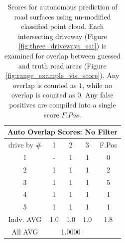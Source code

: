 \documentclass[numbered,pdftex]{ohio-etd}
\begin{document}
{{		\begin{table}[H]
			\centering
			\begin{tabular}{|llllc|}
				\hline
				\multicolumn{5}{|c|}{Auto Overlap Scores: No Filter}                                                                            \\ \hline
				\multicolumn{1}{|c|}{drive by \#}& \multicolumn{1}{c|}{1} 	& \multicolumn{1}{c|}{2} 	& \multicolumn{1}{c|}{3}   	& F.Pos 	\\ \hline
				\multicolumn{1}{|c|}{1}          & \multicolumn{1}{c|}{-} 	& \multicolumn{1}{c|}{1} 	& \multicolumn{1}{c|}{1}   	& 0     	\\ \hline
				\multicolumn{1}{|c|}{2}          & \multicolumn{1}{c|}{1} 	& \multicolumn{1}{c|}{1} 	& \multicolumn{1}{c|}{1}   	& 2     	\\ \hline
				\multicolumn{1}{|c|}{3}          & \multicolumn{1}{c|}{1} 	& \multicolumn{1}{c|}{1} 	& \multicolumn{1}{c|}{1}   	& 5     	\\ \hline
				\multicolumn{1}{|c|}{4}          & \multicolumn{1}{c|}{1} 	& \multicolumn{1}{c|}{1} 	& \multicolumn{1}{c|}{1}   	& 1     	\\ \hline
				\multicolumn{1}{|c|}{5}          & \multicolumn{1}{c|}{1} 	& \multicolumn{1}{c|}{1} 	& \multicolumn{1}{c|}{1}   	& 1     	\\ \hline
				\multicolumn{1}{|c|}{Indv. AVG}  & \multicolumn{1}{c|}{1.0} & \multicolumn{1}{c|}{1.0} 	& \multicolumn{1}{c|}{1.0} 	& 1.8 		\\ \hline
				\multicolumn{1}{|c|}{All AVG}    & \multicolumn{3}{c|}{1.0000}                                                   	&			\\ \hline
			\end{tabular}
			\caption[Overlap Scoring Table - Auto with No Classification Filter]{Scores for autonomous prediction of road surfaces using un-modified classified point cloud. Each intersecting driveway (Figure \ref{fig:three_driveways_sat}) is examined for overlap between guessed and truth road areas (Figure \ref{fig:range_example_vis_score}). Any overlap is counted as $1$, while no overlap is counted as $0$. Any false positives are compiled into a single score $F.Pos$.}
			\label{tab:example_overlap_score_auto}
		\end{table}
		
}}
\end{document}
